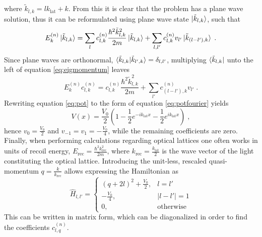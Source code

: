 where $\tilde{k}_{l,k} = l k_{\mathrm{lat}} + k$. From this it is clear that the problem has a plane wave solution, thus it can be reformulated using plane wave state $\ket{\tilde{k}_{l,k}}$, such that
\begin{equation}
	E_{k}^{(n)} \ket{\tilde{k}_{l,k}} = \sum_l c_{l,k}^{(n)} \frac{\hbar^2 \tilde{k}_{l,k}^2}{2 m} \ket{\tilde{k}_{l,k}} + \sum_{l,l'} c_{l,k}^{(n)} v_{l'} \ket{\tilde{k}_{(l-l'),k}} \; . \label{eq:eigmomentum}
\end{equation}
Since plane waves are orthonormal, $\braket{\tilde{k}_{l,k} | \tilde{k}_{l',k}} = \delta_{l,l'}$, multiplying $\bra{\tilde{k}_{l,k} }$ unto the left of equation \ref{eq:eigmomentum} leaves
\begin{equation}
	E_{k}^{(n)} c_{l,k}^{(n)} =  c_{l,k}^{(n)} \frac{\hbar^2 \tilde{k}_{l,k}^2}{2 m}  + \sum_{l'} c_{(l-l'),k}^{(n)} v_{l'} \; .
\end{equation}
Rewriting equation \ref{eq:pot} to the form of equation \ref{eq:potfourier} yields
\begin{equation}
	V(x) = \frac{V_0}{2} \left( 1 - \frac{1}{2} e^{-i k_{\mathrm{lat}} x} - \frac{1}{2} e^{i k_{\mathrm{lat}} x} \right) \; ,
\end{equation}
hence $v_0 = \frac{V_0}{2}$ and $v_{-1} = v_{1} = - \frac{V_0}{4}$, while the remaining coefficients are zero.
Finally, when performing calculations regarding optical lattices one often works in units of recoil energy, $E_{\mathrm{rec}} = \frac{\hbar^2 k_{\mathrm{rec}}^2}{2 m}$, where $k_{\mathrm{rec}} = \frac{k_{\mathrm{lat}}}{2}$ is the wave vector of the light constituting the optical lattice. Introducing the unit-less, rescaled quasi-momentum $q = \frac{k}{k_{\mathrm{rec}}}$ allows expressing the Hamiltonian as
\begin{equation*}
\hat{H}_{l,l'} =
    \begin{cases}
     	 (q + 2 l)^2 + \frac{V_0}{2} , & l = l'  \\
     	 - \frac{V_0}{4} , & | l - l'| = 1  \\
     	 0 , & \text{otherwise} 
    \end{cases}
\end{equation*}
This can be written in matrix form, which can be diagonalized in order to find the coefficients $c_{l,q}^{(n)}$.

